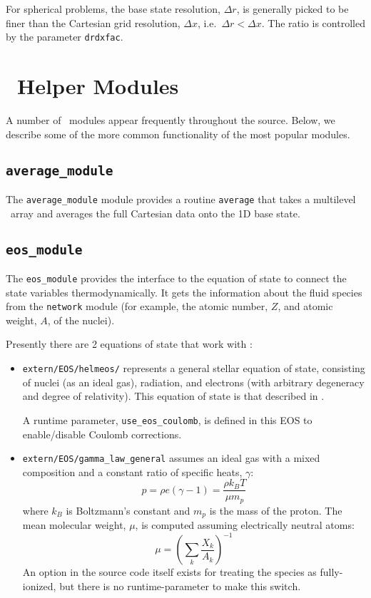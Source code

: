 For spherical problems, the base state resolution, $\Delta r$, is
generally picked to be finer than the Cartesian grid resolution,
$\Delta x$, i.e.\ $\Delta r < \Delta x$.  The ratio is controlled
by the parameter {\tt drdxfac}.



\section{\maestro\ Helper Modules}

A number of \maestro\ modules appear frequently throughout the source.
Below, we describe some of the more common functionality of the most
popular modules.

\subsection{\tt average\_module}

The {\tt average\_module} module provides a routine {\tt average} that takes
a multilevel \multifab\ array and averages the full Cartesian data
onto the 1D base state.

\subsection{{\tt eos\_module}}

The {\tt eos\_module} provides the interface to the equation of 
state to connect the state variables thermodynamically.  It 
gets the information about the fluid species from the {\tt network}
module (for example, the atomic number, $Z$, and atomic weight, $A$,
of the nuclei).

Presently there are 2 equations of state that work with \maestro:
\begin{itemize}
\item {\tt extern/EOS/helmeos/} represents a general stellar equation 
      of state, consisting of nuclei (as an ideal gas), radiation,
      and electrons (with arbitrary degeneracy and degree of relativity).
      This equation of state is that described in \cite{timmes_eos}.

      A runtime parameter, {\tt use\_eos\_coulomb}, is defined in
      this EOS to enable/disable Coulomb corrections.

\item {\tt extern/EOS/gamma\_law\_general} assumes an ideal gas with a mixed 
     composition and a constant ratio of specific heats, $\gamma$:
      \begin{equation}
      p = \rho e (\gamma - 1) = \frac{\rho k_B T}{\mu m_p} 
      \end{equation}
     where $k_B$ is Boltzmann's constant and $m_p$ is the mass of the
     proton.
     The mean molecular weight, $\mu$, is computed assuming 
     electrically neutral atoms:
     \begin{equation}
     \mu = \left ( \sum_k \frac{X_k}{A_k} \right )^{-1}
     \end{equation}
     An option in the source code itself exists for treating the
     species as fully-ionized, but there is no runtime-parameter to
     make this switch.
\end{itemize}

